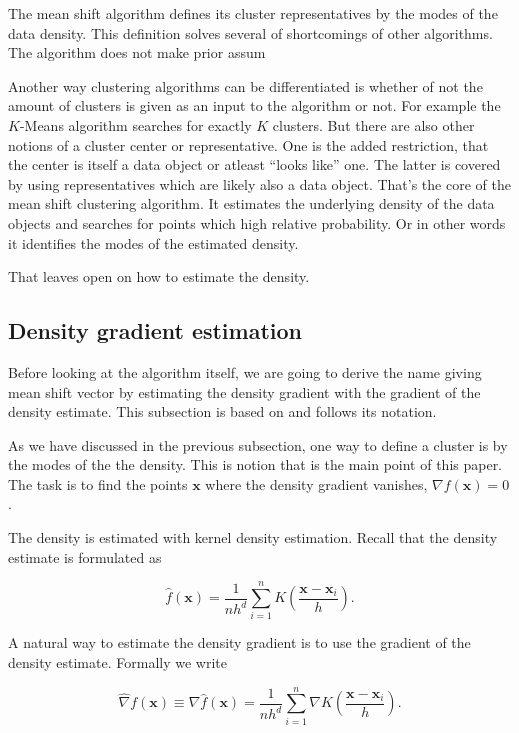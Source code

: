 \documentclass{article}
\begin{document}
The mean shift algorithm defines its cluster representatives by the modes of the data density. This definition solves several of shortcomings of other algorithms. The algorithm does not make prior assum


Another way clustering algorithms can be differentiated is whether of not the amount of clusters is given as an input to the algorithm or not. For example the $K$-Means algorithm searches for exactly $K$ clusters. But there are also other notions of a cluster center or representative. One is the added restriction, that the center is itself a data object or atleast ``looks like'' one. The latter is covered by using representatives which are likely also a data object. That's the core of the mean shift clustering algorithm. It estimates the underlying density of the data objects and searches for points which high relative probability. Or in other words it identifies the modes of the estimated density.

That leaves open on how to estimate the density.

\subsection{Density gradient estimation}

Before looking at the algorithm itself, we are going to derive the name giving mean shift vector by estimating the density gradient with the gradient of the density estimate. This subsection is based on \cite{Comaniciu.2002} and follows its notation.

As we have discussed in the previous subsection, one way to define a cluster is by the modes of the the density. This is notion that is the main point of this paper. The task is to find the points $\bm{x}$ where the density gradient vanishes, $\nabla f(\bm{x}) = 0$.

The density is estimated with kernel density estimation. Recall that the density estimate is formulated as

\begin{equation}
	\hat{f}(\bm{x}) = \frac{1}{nh^d} \sum_{i=1}^n K\left(\frac{\bm{x} - \bm{x}_i}{h} \right)\text{.}
	\label{eq:kernel-density-estimate-2}
\end{equation}

A natural way to estimate the density gradient is to use the gradient of the density estimate. Formally we write

\begin{equation}
	\hat\nabla f(\bm{x}) \equiv \nabla \hat{f}(\bm{x}) = \frac{1}{nh^d} \sum_{i=1}^n \nabla K\left(\frac{\bm{x} - \bm{x}_i}{h} \right)\text{.}
	\label{eq:kernel-density-gradient-estimate}
\end{equation}
\end{document}
